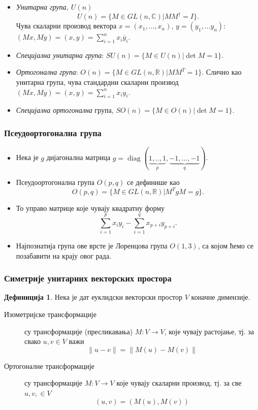 \documentclass{beamer}
\theoremstyle{plain}
\theoremstyle{definition}
\newtheorem*{defn}{Дефиниција}
\begin{document}
\begin{frame}
\begin{itemize}
\item \emph{Унитарна група, $U(n)$}
  $$U(n) = \{M\in GL(n, \mathbb{C})|MM^\dag = I\}.$$
  Чува скаларни производ вектора $x = (x_1, ..., x_n)$, $y = (y_1, ...y_n)$:
  $(Mx, My) = (x, y) = \sum_{i=1}^n x_i \overline{y}_i.$
\item \emph{Специјална унитарна група}: $SU(n) = \{M\in U(n)|\det M = 1\}.$
\item \emph{Ортогонална група}: $O(n) = \{M\in GL(n, \mathbb{R})|MM^T = 1\}.$
  Слично као унитарна група, чува стандардни скаларни производ
  $(Mx, My) = (x, y) = \sum_{i=1}^n x_i y_i.$
\item \emph{Специјална ортогонална} група, $SO(n) = \{M\in O(n)|\det M = 1\}.$
\end{itemize}
\end{frame}

\begin{frame}
\frametitle{Псеудоортогонална група}
\begin{itemize}
\item Нека је $g$ дијагонална матрица $g = \operatorname{diag}(\underbrace{1, .., 1}_p, \underbrace{-1, ..., -1}_q)$.
\item Псеудоортогонална група $O(p, q)$ се дефинише као
      $$O(p, q) = \{M\in GL(n, \mathbb{R})|M^TgM = g\}.$$
\item То управо матрице које чувају квадратну форму
      $$\sum_{i=1}^p x_iy_i - \sum_{i=1}^q x_{p+i}y_{p+i}.$$
\item Најпознатија група ове врсте је Лоренцова група $O(1, 3)$, са којом ћемо се позабавити на крају овог рада.
\end{itemize}
\end{frame}

\begin{frame}
\frametitle{Симетрије унитарних векторских простора}
\begin{defn}
Нека је дат еуклидски векторски простор $V$ коначне димензије.
\begin{description}
  \item[Изометријске трансформације] су трансформације (пресликавања) $M: V\to V$, које чувају растојање, тј. за свако $u,v\in V$ важи
  $$\|u-v\| = \|M(u)-M(v)\|$$
  \item[Ортогоналне трансформације] су трансформације $M: V\to V$ које чувају скаларни производ, тј. за све $u, v, \in V$
  $$(u, v) = (M(u), M(v))$$
\end{description}
\end{defn}
\end{frame}
\end{document}
